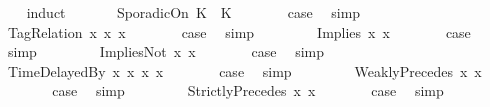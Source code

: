 \begin{isabellebody}
%
\isadelimproof
\ \ %
\endisadelimproof
%
\isatagproof
{}\isamarkupfalse%
\ {\isacharparenleft}induct\ {\isasymphi}{\isacharparenright}\isanewline
\ \ \ \ \isamarkupfalse%
\ {\isacharparenleft}SporadicOn\ K\ {\isasymtau}\ K\isanewline
\ \ \ \ \isamarkupfalse%
\ \isamarkupfalse%
\ {\isacharquery}case\ \isamarkupfalse%
\ simp\isanewline
\ \ \isamarkupfalse%
\isanewline
\ \ \ \ \isamarkupfalse%
\ {\isacharparenleft}TagRelation\ x{}\ x{}\ x{}{\isacharparenright}\isanewline
\ \ \ \ \isamarkupfalse%
\ \isamarkupfalse%
\ {\isacharquery}case\ \isamarkupfalse%
\ simp\isanewline
\ \ \isamarkupfalse%
\isanewline
\ \ \ \ \isamarkupfalse%
\ {\isacharparenleft}Implies\ x{}\ x{}{\isacharparenright}\isanewline
\ \ \ \ \isamarkupfalse%
\ \isamarkupfalse%
\ {\isacharquery}case\ \isamarkupfalse%
\ simp\isanewline
\ \ \isamarkupfalse%
\isanewline
\ \ \ \ \isamarkupfalse%
\ {\isacharparenleft}ImpliesNot\ x{}\ x{}{\isacharparenright}\isanewline
\ \ \ \ \isamarkupfalse%
\ \isamarkupfalse%
\ {\isacharquery}case\ \isamarkupfalse%
\ simp\isanewline
\ \ \isamarkupfalse%
\isanewline
\ \ \ \ \isamarkupfalse%
\ {\isacharparenleft}TimeDelayedBy\ x{}\ x{}\ x{}\ x{}{\isacharparenright}\isanewline
\ \ \ \ \isamarkupfalse%
\ \isamarkupfalse%
\ {\isacharquery}case\ \isamarkupfalse%
\ simp\isanewline
\ \ \isamarkupfalse%
\isanewline
\ \ \ \ \isamarkupfalse%
\ {\isacharparenleft}WeaklyPrecedes\ x{}\ x{}{\isacharparenright}\isanewline
\ \ \ \ \isamarkupfalse%
\ \isamarkupfalse%
\ {\isacharquery}case\ \isamarkupfalse%
\ simp\isanewline
\ \ \isamarkupfalse%
\isanewline
\ \ \ \ \isamarkupfalse%
\ {\isacharparenleft}StrictlyPrecedes\ x{}\ x{}{\isacharparenright}\isanewline
\ \ \ \ \isamarkupfalse%
\ \isamarkupfalse%
\ {\isacharquery}case\ \isamarkupfalse%
\ simp\isanewline
\ \ \isamarkupfalse%

\end{isabellebody}
